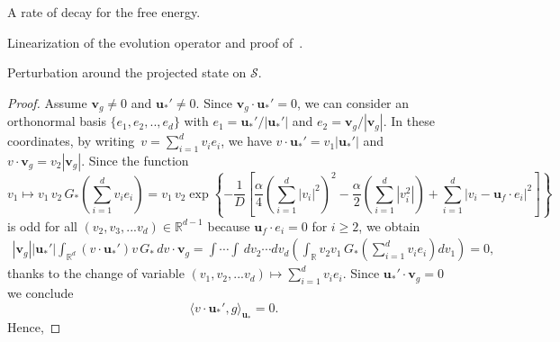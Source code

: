 \documentclass[reqno]{amsart} %
\begin{document}
\begin{section}{A rate of decay for the free energy.}
\begin{section}{Linearization of the evolution operator and proof of~\texorpdfstring{}{thm3}.}
\begin{subsection}{Perturbation around the projected state on \texorpdfstring{$\mathcal{S}$}{S}.}
\begin{proof}
Assume $\mathbf{v}_g\neq 0$ and $\mathbf{u}_*'\neq0$. Since $\mathbf{v}_g \cdot \mathbf{u}_*'=0$, we can consider an orthonormal basis $\{e_1,e_2,..,e_d\}$ with $e_1=\mathbf{u}_*'/|\mathbf{u}_*'|$ and $e_2=\mathbf{v}_g/|\mathbf{v}_g|$. In these coordinates, by writing~$v=\sum_{i=1}^d v_ie_i$, we have $v\cdot \mathbf{u}_*'=v_1 |\mathbf{u}_*'|$ and $v\cdot \mathbf{v}_g=v_2|\mathbf{v}_g|$. Since the function $$v_1\mapsto v_1 \,v_2 \,G_{*} \left(\sum_{i=1}^dv_ie_i\right)=  v_1 \,v_2 \exp \left\{-\frac{1}{D}\left[\frac{\alpha }{4} \left(\sum_{i=1}^d|v_i|^2 \right)^2-\frac{\alpha}{2}\left( \sum_{i=1}^d |v_i^2|\right)+ \sum_{i=1}^d |v_i-\mathbf{u}_{f}\cdot e_i|^2\right] \right\}$$ is odd for all $(v_2,v_3,...v_d) \in \mathbb{R}^{d-1}$ because $\mathbf{u}_{f}\cdot e_i=0$ for $i\geq 2$, we obtain 
\begin{align*}
    |\mathbf{v}_g||\mathbf{u}_*'|\int_{\mathbb{R}^d}(v\cdot \mathbf{u}_*') v  \,G_{*}\,dv \cdot \mathbf{v}_g=\int \cdots \int  \, dv_2 \cdots dv_d
\left(\int_{\mathbb{R}}v_2 v_1  \,G_{*} \left(\sum_{i=1}^dv_ie_i\right)dv_1\right)=0,
\end{align*}
thanks to the change of variable $(v_1,v_2,...v_d)\mapsto \sum_{i=1}^dv_ie_i$.
Since $\mathbf{u}_*'\cdot \mathbf{v}_g=0$ we conclude 
$$\langle v\cdot \mathbf{u}_*',g\rangle_{\mathbf{u}_*}=0.$$
Hence, 


\end{proof}
\end{subsection}
\end{section}
\end{section}
\end{document}
